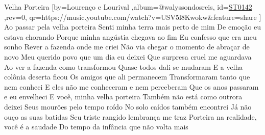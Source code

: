 \beginsong
{Velha Porteira %
}[by={Lourenço e Lourival %
},album={@walyssondosreis},
id={\href{https://music.youtube.com/watch?v=USV5l8Kwokw&feature=share %
}{ST0142 %
}},rev={0}, %
qr={https://music.youtube.com/watch?v=USV5l8Kwokw&feature=share %
}]
\tom{}{}
\beginverse
Ao passar pela velha porteira
Senti minha terra mais perto de mim
De emoção eu estava chorando
Porque minha angústia chegava ao fim
\endverse
\beginverse
Eu confesso que era meu sonho
Rever a fazenda onde me criei
Não via chegar o momento de abraçar de novo
Meu querido povo que um dia eu deixei
\endverse
\beginverse
Que surpresa cruel me aguardava
Ao ver a fazenda como transformou
Quase todos dali se mudaram
E a velha colônia deserta ficou
\endverse
\beginverse
Os amigos que ali permanecem
Transformaram tanto que nem conheci
E eles não me conheceram e nem perceberam
Que os anos passaram e eu envelheci
\endverse
\beginverse
E você, minha velha porteira
Também não está como outrora deixei
Seus mourões pelo tempo roído
No solo caídos também encontrei
\endverse
\beginverse
Já não ouço as suas batidas
Seu triste rangido lembrança me traz
Porteira na realidade, você é a saudade
Do tempo da infância que não volta mais
\endverse

